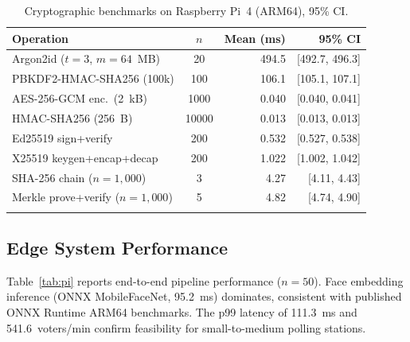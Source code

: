 \documentclass[pdflatex,sn-mathphys-num]{sn-jnl}%
\theoremstyle{thmstyleone}%
\theoremstyle{thmstyletwo}%
\theoremstyle{thmstylethree}%
\begin{document}
\begin{table}[t]
\caption{Cryptographic benchmarks on Raspberry Pi~4 (ARM64), 95\% CI.}
\label{tab:crypto}%
\begin{tabular}{@{}lcrr@{}}
  \toprule
  Operation & \(n\) & Mean (ms) & 95\% CI \\
  \midrule
  Argon2id (\(t{=}3\), \(m{=}64\)~MB) & 20    & 494.5 & [492.7, 496.3] \\
  PBKDF2-HMAC-SHA256 (100k)            & 100   & 106.1 & [105.1, 107.1] \\
  AES-256-GCM enc.\ (2~kB)            & 1000  & 0.040 & [0.040, 0.041] \\
  HMAC-SHA256 (256~B)                  & 10000 & 0.013 & [0.013, 0.013] \\
  Ed25519 sign+verify                  & 200   & 0.532 & [0.527, 0.538] \\
  X25519 keygen+encap+decap            & 200   & 1.022 & [1.002, 1.042] \\
  SHA-256 chain (\(n{=}1{,}000\))     & 3     & 4.27  & [4.11, 4.43]   \\
  Merkle prove+verify (\(n{=}1{,}000\))& 5    & 4.82  & [4.74, 4.90]   \\
  \botrule
\end{tabular}
\end{table}

\subsection{Edge System Performance}

Table~\ref{tab:pi} reports end-to-end pipeline performance (\(n{=}50\)). Face
embedding inference (ONNX MobileFaceNet, 95.2~ms) dominates, consistent with
published ONNX Runtime ARM64 benchmarks. The p99 latency of 111.3~ms and
541.6~voters/min confirm feasibility for small-to-medium polling stations.
\end{document}
